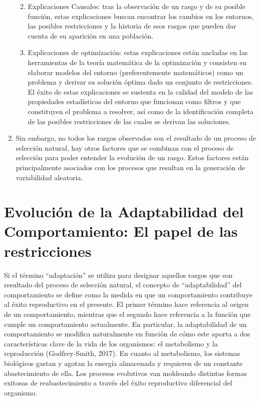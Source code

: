 \documentclass[
  letterpaper,
]{book}
\begin{document}
\begin{enumerate}
  \begin{enumerate}
  \def\labelenumii{\alph{enumii}.}
  \item
    Explicaciones Causales: tras la observación de un rasgo y de su
    posible función, estas explicaciones buscan encontrar los cambios en
    los entornos, las posibles restricciones y la historia de esos
    rasgos que pueden dar cuenta de su aparición en una población.
  \item
    Explicaciones de optimización: estas explicaciones están ancladas en
    las herramientas de la teoría matemática de la optimización y
    consisten en elaborar modelos del entorno (preferentemente
    matemáticos) como un problema y derivar su solución óptima dado un
    conjunto de restricciones. El éxito de estas explicaciones se
    sustenta en la calidad del modelo de las propiedades estadísticas
    del entorno que funcionan como filtros y que constituyen el problema
    a resolver, así como de la identificación completa de las posibles
    restricciones de las cuales se derivan las soluciones.
  \end{enumerate}
\item
  Sin embargo, no todos los rasgos observados son el resultado de un
  proceso de selección natural, hay otros factores que se combinan con
  el proceso de selección para poder entender la evolución de un rasgo.
  Estos factores están principalmente asociados con los procesos que
  resultan en la generación de variabilidad aleatoria.
\end{enumerate}


\chapter{Evolución de la Adaptabilidad del Comportamiento: El papel de
las
restricciones}\label{evoluciuxf3n-de-la-adaptabilidad-del-comportamiento-el-papel-de-las-restricciones}

Si el término ``adaptación'' se utiliza para designar aquellos rasgos
que son resultado del proceso de selección natural, el concepto de
``adaptabilidad'' del comportamiento se define como la medida en que un
comportamiento contribuye al éxito reproductivo en el presente. El
primer término hace referencia al origen de un comportamiento, mientras
que el segundo hace referencia a la función que cumple un comportamiento
actualmente. En particular, la adaptabilidad de un comportamiento se
modifica naturalmente en función de cómo este aporta a dos
características clave de la vida de los organismos: el metabolismo y la
reproducción (Godfrey-Smith, 2017). En cuanto al metabolismo, los
sistemas biológicos gastan y agotan la energía almacenada y requieren de
un constante abastecimiento de ella. Los procesos evolutivos van
moldeando distintas formas exitosas de reabastecimiento a través del
éxito reproductivo diferencial del organismo.
\end{document}
